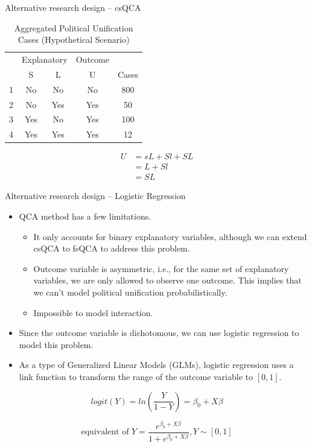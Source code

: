 \documentclass{beamer}
\begin{document}
	\begin{frame}{Alternative research design -- csQCA}
		\begin{table}
			\centering
			\caption{Aggregated Political Unification Cases (Hypothetical Scenario)}
			\begin{tabular}{ccccc}
				\toprule
				& \multicolumn{2}{c}{Explanatory} & Outcome & \\
				\cmidrule(lr){2-3} \cmidrule(lr){4-4} 
				& S & L & U & Cases \\
				\midrule
				1 & No & No & No & 800 \\
				2 & No & Yes & Yes & 50 \\
				3 & Yes & No & Yes & 100 \\
				4 & Yes & Yes & Yes & 12 \\
				\bottomrule
			\end{tabular}
		\end{table}
		\begin{equation}
			\begin{aligned}
				U & =sL+Sl+SL \\
				  & =L+Sl\\
				  & =SL
			\end{aligned}
		\end{equation}
	\end{frame}



	\begin{frame}{Alternative research design -- Logistic Regression}
		\begin{itemize}
			\item QCA method has a few limitations.
			\begin{itemize}
				\item It only accounts for binary explanatory variables, although we can extend csQCA to fsQCA to address this problem.
				\item Outcome variable is asymmetric, i.e., for the same set of explanatory variables, we are only allowed to observe one outcome. This implies that we can't model political unification probabilistically.
				\item Impossible to model interaction.
			\end{itemize}
			\item Since the outcome variable is dichotomous, we can use logistic regression to model this problem.
			\item As a type of Generalized Linear Models (GLMs), logistic regression uses a link function to transform the range of the outcome variable to $[0,1]$.
		\end{itemize}
		\begin{equation*}
			logit(Y)=ln(\frac{Y}{1-Y})=\beta_0 + X\beta
		\end{equation*}
		
		\begin{equation*}
			\text{equivalent of }Y=\frac{e^{\beta_0 + X\beta}}{1+e^{\beta_0 + X\beta}},
			Y \sim [0,1]
		\end{equation*}
	\end{frame}
\end{document}
